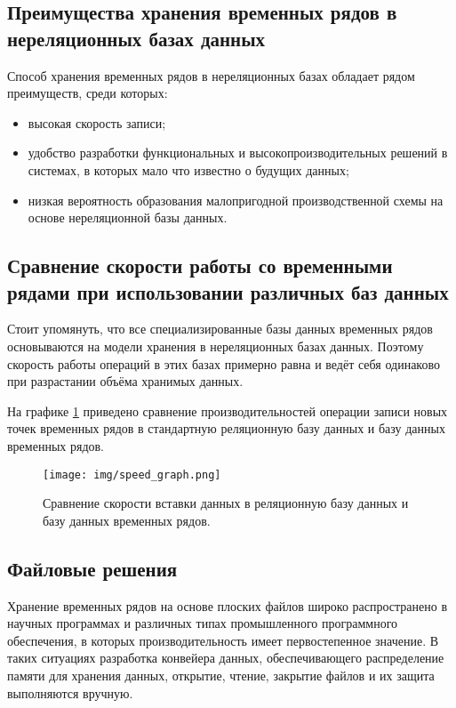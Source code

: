 \subsection{Преимущества хранения временных рядов в нереляционных базах данных}

Способ хранения временных рядов в нереляционных базах обладает рядом преимуществ, среди которых:

\begin{itemize}[label=—]
	\item высокая скорость записи;
	\item удобство разработки функциональных и высокопроизводительных решений в системах, 
	в которых мало что известно о будущих данных;
	\item низкая вероятность образования малопригодной производственной схемы на основе
	нереляционной базы данных.
\end{itemize}

\subsection{Сравнение скорости работы со временными рядами при использовании различных баз данных}

Стоит упомянуть, что все специализированные базы данных временных рядов основываются на модели 
хранения в нереляционных базах данных. Поэтому скорость работы операций в этих базах примерно равна и 
ведёт себя одинаково при разрастании объёма хранимых данных.

На графике \ref{fig:speed_graph} приведено сравнение производительностей операции записи новых точек 
временных рядов в стандартную реляционную базу данных и базу данных временных рядов.

\begin{figure}[H]
	\centering
	\texttt{[image: img/speed\_graph.png]}
	\caption{Сравнение скорости вставки данных в реляционную базу данных и базу данных временных рядов. }
	\label{fig:speed_graph}
\end{figure}

\subsection{Файловые решения}

Хранение временных рядов на основе плоских файлов широко распространено в научных программах и 
различных типах промышленного программного обеспечения, в которых производительность имеет 
первостепенное значение. В таких ситуациях разработка конвейера данных, обеспечивающего распределение 
памяти для хранения данных, открытие, чтение, закрытие файлов и их защита выполняются вручную. 

